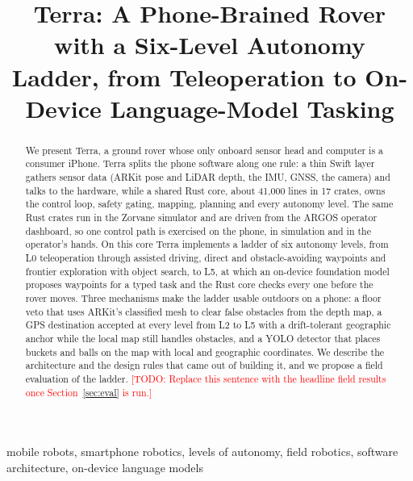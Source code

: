 \documentclass[conference]{IEEEtran}
\newcommand{\todo}[1]{\textcolor{red}{[TODO: #1]}}
\begin{document}
\title{Terra: A Phone-Brained Rover with a Six-Level Autonomy Ladder, from Teleoperation to On-Device Language-Model Tasking}

\author{
\IEEEauthorblockA{\todo{affiliation, department, university}\\
\todo{email}}}

\maketitle

\begin{abstract}
We present Terra, a ground rover whose only onboard sensor head and computer is a consumer iPhone.
Terra splits the phone software along one rule: a thin Swift layer gathers sensor data (ARKit pose and LiDAR depth, the IMU, GNSS, the camera) and talks to the hardware, while a shared Rust core, about 41{,}000 lines in 17 crates, owns the control loop, safety gating, mapping, planning and every autonomy level.
The same Rust crates run in the Zorvane simulator and are driven from the ARGOS operator dashboard, so one control path is exercised on the phone, in simulation and in the operator's hands.
On this core Terra implements a ladder of six autonomy levels, from L0 teleoperation through assisted driving, direct and obstacle-avoiding waypoints and frontier exploration with object search, to L5, at which an on-device foundation model proposes waypoints for a typed task and the Rust core checks every one before the rover moves.
Three mechanisms make the ladder usable outdoors on a phone: a floor veto that uses ARKit's classified mesh to clear false obstacles from the depth map, a GPS destination accepted at every level from L2 to L5 with a drift-tolerant geographic anchor while the local map still handles obstacles, and a YOLO detector that places buckets and balls on the map with local and geographic coordinates.
We describe the architecture and the design rules that came out of building it, and we propose a field evaluation of the ladder.
\todo{Replace this sentence with the headline field results once Section~\ref{sec:eval} is run.}
\end{abstract}

\begin{IEEEkeywords}
mobile robots, smartphone robotics, levels of autonomy, field robotics, software architecture, on-device language models
\end{IEEEkeywords}

\end{document}
